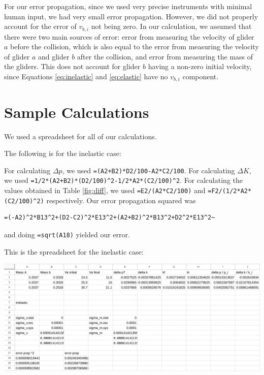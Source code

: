 \documentclass[12pt]{article}
\begin{document}
For our error propagation, since we used very precise instruments with minimal human input, we had very small error propagation. However, we did not properly account for the error of \(v_{b,i}\) not being zero. In our calculation, we assumed that there were two main sources of error: error from measuring the velocity of glider \(a\) before the collision, which is also equal to the error from measuring the velocity of glider \(a\) and glider \(b\) after the collision, and error from measuring the mass of the gliders. This does not account for glider \(b\) having a non-zero initial velocity, since Equations \ref{eq:inelastic} and \ref{eq:elastic} have no \(v_{b,i}\) component.
\section{Sample Calculations}
\label{sec:orgff02e7b}

We used a spreadsheet for all of our calculations.

The following is for the inelastic case:

For calculating \(\Delta p\), we used \texttt{=(A2+B2)*D2/100-A2*C2/100}. For calculating \(\Delta K\), we used \texttt{=1/2*(A2+B2)*(D2/100)\textasciicircum{}2-1/2*A2*(C2/100)\textasciicircum{}2}. For calculating the values obtained in Table \ref{fig:diff}, we used \texttt{=E2/(A2*C2/100)} and \texttt{=F2/(1/2*A2*(C2/100)\textasciicircum{}2)} respectively. Our error propagation squared was
\begin{verbatim}
=(-A2)^2*B13^2+(D2-C2)^2*E13^2+(A2+B2)^2*B13^2+D2^2*E13^2~
\end{verbatim}
and doing \texttt{=sqrt(A18)} yielded our error.

This is the spreadsheet for the inelastic case:

\begin{center}
\includegraphics[width=6.5in]{./inelastic.png}
\end{center}
\end{document}
